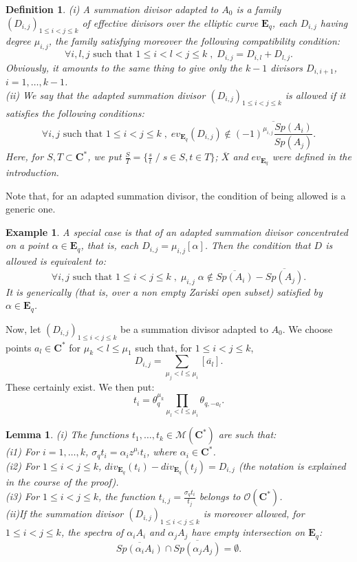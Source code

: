 \documentclass[english]{smfart}
\newtheorem{lemma}[thm]{Lemma}
\newtheorem{example}[thm]{Example}
\newtheorem{defn}[thm]{Definition}
\numberwithin{equation}{thm}
\def\sq{\sigma_q}
\def\C{{\mathbf C}}
\def\Eq{{\mathbf{E}_{q}}}
\def\Kw{{\mathcal{M}(\C^{*})}}
\def\th{\theta}
\begin{document}
\begin{defn}
(i) A summation divisor adapted to $A_{0}$ 
is a family $(D_{i,j})_{1 \leq i < j \leq k}$ 
of effective divisors over the elliptic curve $\Eq$, each $D_{i,j}$
having degree $\mu_{i,j}$, the family satisfying moreover 
the following compatibility condition:
$$
\forall i,l,j \text{~such that~} 1 \leq i < l < j \leq k \;,\;
D_{i,j} = D_{i,l} + D_{l,j}.
$$
Obviously, it amounts to the same thing to give only the $k-1$
divisors $D_{i,i+1}$, $i = 1,\ldots,k-1$. \\
(ii) We say that the adapted summation divisor 
$(D_{i,j})_{1 \leq i < j \leq k}$ 
is allowed if it satisfies the following conditions:
$$
\forall i,j \text{~such that~} 1 \leq i < j \leq k \;,\;
ev_{\Eq}(D_{i,j}) \not\in 
\overline{(-1)^{\mu_{i,j}} \frac{Sp(A_{i})}{Sp(A_{j})}}.
$$
Here, for $S,T \subset \C^{*}$, we put
$\frac{S}{T} = \{\frac{s}{t} \;/\; s \in S , t \in T\}$;
$\overline{X}$ and $ev_{\Eq}$ were defined in the introduction.
\end{defn}
Note that, for an adapted summation divisor, the condition
of being allowed is a generic one. 

\begin{example}
A special case is that of an adapted summation divisor concentrated 
on a point $\alpha \in \Eq$, that is, each $D_{i,j} = \mu_{i,j} [\alpha]$. 
Then the condition that $D$ is allowed is equivalent to:
$$
\forall i,j \text{~such that~} 1 \leq i < j \leq k \;,\;
\mu_{i,j} \; \alpha \not\in \overline{Sp(A_{i})} - \overline{Sp(A_{j})}.
$$
It is generically (that is, over a non empty Zariski open subset)
satisfied by $\alpha \in \Eq$. 
\end{example}

Now, let $(D_{i,j})_{1 \leq i < j \leq k}$ be a summation divisor
adapted to $A_{0}$. We choose points $a_{l} \in \C^{*}$ for 
$\mu_{k} < l \leq \mu_{1}$ such that, for $1 \leq i < j \leq k$, 
$$
D_{i,j} = \sum_{\mu_{j} < l \leq \mu_{i}} [\overline{a_{l}}].
$$
These certainly exist. We then put:
$$
t_{i} = \th_{q}^{\mu_{k}} \prod_{\mu_{l} < l \leq \mu_{i}} \th_{q,-a_{l}}.
$$

\begin{lemma}
(i) The functions $t_{1},\ldots,t_{k} \in \Kw$ are such that: \\
(i1) For $i = 1,\ldots,k$, $\sq t_{i} = \alpha_{i} z^{\mu_{i}} t_{i}$,
where $\alpha_{i} \in \C^{*}$. \\
(i2) For $1 \leq i < j \leq k$, 
$div_{\Eq}(t_{i}) - div_{\Eq}(t_{j}) = D_{i,j}$
(the notation is explained in the course of the proof). \\
(i3) For $1 \leq i < j \leq k$,
the function $t_{i,j} = \frac{\sq t_{i}}{t_{j}}$ belongs to
$\mathcal{O}(\C^{*})$. \\
(ii)If the summation divisor $(D_{i,j})_{1 \leq i < j \leq k}$ 
is moreover allowed, for $1 \leq i < j \leq k$, the spectra of 
$\alpha_{i} A_{i}$ and $\alpha_{j} A_{j}$ have empty intersection 
on $\Eq$:
$$
\overline{Sp(\alpha_{i} A_{i})} \cap \overline{Sp(\alpha_{j} A_{j})} =
\emptyset.
$$
\end{lemma}
\end{document}
